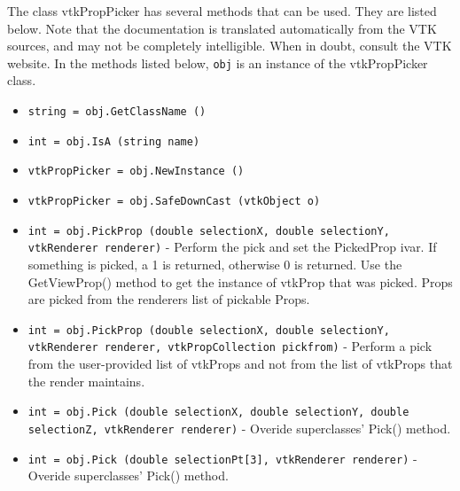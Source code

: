 The class vtkPropPicker has several methods that can be used.
  They are listed below.
Note that the documentation is translated automatically from the VTK sources,
and may not be completely intelligible.  When in doubt, consult the VTK website.
In the methods listed below, \verb|obj| is an instance of the vtkPropPicker class.
\begin{itemize}
\item  \verb|string = obj.GetClassName ()|

\item  \verb|int = obj.IsA (string name)|

\item  \verb|vtkPropPicker = obj.NewInstance ()|

\item  \verb|vtkPropPicker = obj.SafeDownCast (vtkObject o)|

\item  \verb|int = obj.PickProp (double selectionX, double selectionY, vtkRenderer renderer)| -  Perform the pick and set the PickedProp ivar. If something is picked, a
 1 is returned, otherwise 0 is returned.  Use the GetViewProp() method
 to get the instance of vtkProp that was picked.  Props are picked from
 the renderers list of pickable Props.

\item  \verb|int = obj.PickProp (double selectionX, double selectionY, vtkRenderer renderer, vtkPropCollection pickfrom)| -  Perform a pick from the user-provided list of vtkProps and not from the
 list of vtkProps that the render maintains.

\item  \verb|int = obj.Pick (double selectionX, double selectionY, double selectionZ, vtkRenderer renderer)| -  Overide superclasses' Pick() method.

\item  \verb|int = obj.Pick (double selectionPt[3], vtkRenderer renderer)| -  Overide superclasses' Pick() method.

\end{itemize}
